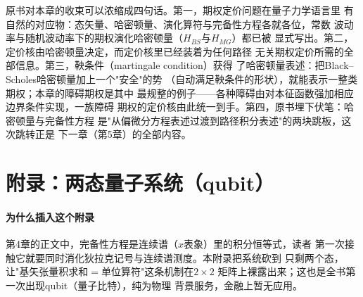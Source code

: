 原书对本章的收束可以浓缩成四句话。第一，期权定价问题在量子力学语言里
有自然的对应物：态矢量、哈密顿量、演化算符与完备性方程各就各位，常数
波动率与随机波动率下的期权演化哈密顿量（$H_{BS}$与$H_{MG}$）都已被
显式写出。第二，定价核由哈密顿量决定，而定价核里已经装着为任何路径
无关期权定价所需的全部信息。第三，鞅条件（martingale condition）获得
了哈密顿量表述：把Black--Scholes哈密顿量加上一个"安全"的势
（自动满足鞅条件的形状），就能表示一整类期权；本章的障碍期权是其中
最规整的例子——各种障碍由对本征函数强加相应边界条件实现，一族障碍
期权的定价核由此统一到手。第四，原书埋下伏笔：哈密顿量与完备性方程
是"从偏微分方程表述过渡到路径积分表述"的两块跳板，这次跳转正是
下一章（第5章）的全部内容。

\section{附录：两态量子系统（qubit）}

\paragraph{为什么插入这个附录}
第4章的正文中，完备性方程是连续谱（$x$表象）里的积分恒等式，读者
第一次接触它就要同时消化狄拉克记号与连续谱测度。本附录把系统砍到
只剩两个态，让"基矢张量积求和$=$单位算符"这条机制在$2\times2$
矩阵上裸露出来；这也是全书第一次出现qubit（量子比特），纯为物理
背景服务，金融上暂无应用。

